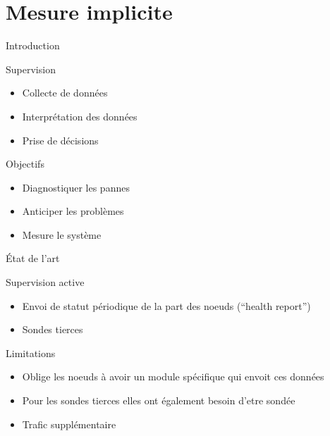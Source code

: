 \section{Mesure implicite} %
\label{sec:supervision_active_&_passive}

\begin{frame}{Introduction}

\begin{block}{Supervision}
  \begin{itemize}
    \item Collecte de données
    \item Interprétation des données
    \item Prise de décisions
  \end{itemize}
\end{block}

\begin{alertblock}{Objectifs}
  \begin{itemize}
    \item Diagnostiquer les pannes
    \item Anticiper les problèmes
    \item Mesure le système
  \end{itemize}
\end{alertblock}
  

\end{frame}

\begin{frame}{État de l'art}
  \begin{block}{Supervision active}
    \begin{itemize}
      \item Envoi de statut périodique de la part des noeuds (``health report'')
      \item Sondes tierces
    \end{itemize}
  \end{block}

  \begin{block}{Limitations}
    \begin{itemize}
      \item Oblige les noeuds à avoir un module spécifique qui envoit ces données
      \item Pour les sondes tierces elles ont également besoin d'etre sondée
      \item Trafic supplémentaire
    \end{itemize}
  \end{block}


\end{frame}

